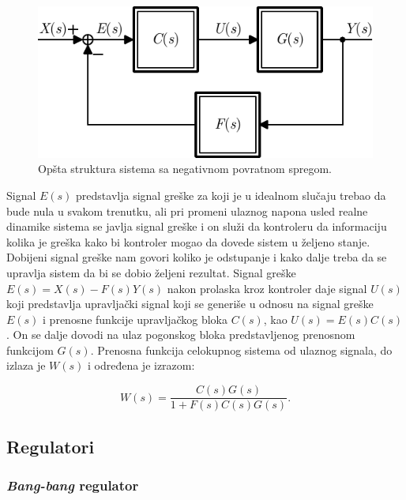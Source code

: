 \documentclass[a4paper, 12pt, diplomski]{etf}
\begin{document}
\begin{figure}[h!]
    \centering
    \includegraphics[scale=1]{fig/nps.pdf}
    \caption{Opšta struktura sistema sa negativnom povratnom spregom.}
    \label{nps}
\end{figure}

Signal $E(s)$ predstavlja signal greške za koji je u idealnom slučaju trebao da bude nula u svakom trenutku, ali pri promeni ulaznog napona usled realne dinamike sistema se javlja signal greške i on služi da kontroleru da informaciju kolika je greška kako bi kontroler mogao da dovede sistem u željeno stanje. Dobijeni signal greške nam govori koliko je odstupanje i kako dalje treba da se upravlja sistem da bi se dobio željeni rezultat. Signal greške $E(s) = X(s) - F(s)Y(s)$ nakon prolaska kroz kontroler daje signal $U(s)$ koji predstavlja upravljački signal koji se generiše u odnosu na signal greške $E(s)$ i prenosne funkcije upravljačkog bloka $C(s)$, kao  $U(s) = E(s)C(s)$. On se dalje dovodi na ulaz pogonskog bloka predstavljenog prenosnom funkcijom $G(s)$.
Prenosna funkcija celokupnog sistema od ulaznog signala, do izlaza je $W(s)$ i određena je izrazom:

\begin{equation}
	W(s) = \frac{C(s)G(s)}{1 + F(s)C(s)G(s)}.
	\label{eq:nps}
\end{equation}



\subsection{Regulatori}

\subsubsection{\textit{Bang-bang} regulator} \label{s:bangbang}
\end{document}
